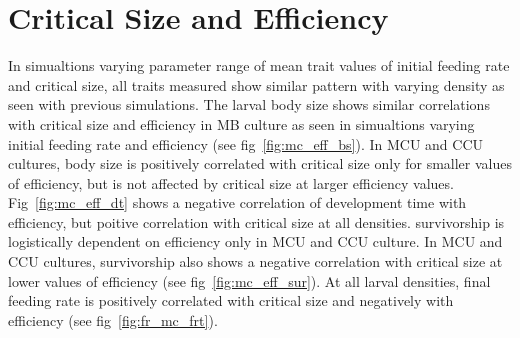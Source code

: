 \section{Critical Size and Efficiency}
In simualtions varying parameter range of mean trait values of initial feeding rate and critical size, all traits measured show similar pattern with varying density as seen with previous simulations. The larval body size shows similar correlations with critical size and efficiency in MB culture as seen in simualtions varying initial feeding rate and efficiency (see fig~\ref{fig:mc_eff_bs}). In MCU and CCU cultures, body size is positively correlated with critical size only for smaller values of efficiency, but is not affected by critical size at larger efficiency values. Fig~\ref{fig:mc_eff_dt} shows a negative correlation of development time with efficiency, but poitive correlation with critical size at all densities. survivorship is logistically dependent on efficiency only in MCU and CCU culture. In MCU and CCU cultures, survivorship also shows a negative correlation with critical size at lower values of efficiency (see fig~\ref{fig:mc_eff_sur}). At all larval densities, final feeding rate is positively correlated with critical size and negatively with efficiency (see fig~\ref{fig:fr_mc_frt}).
